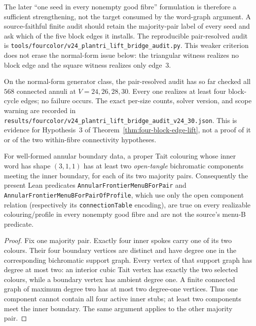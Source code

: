 The later ``one seed in every nonempty good fibre'' formulation is therefore
a sufficient strengthening, not the target consumed by the word-graph
argument.  A source-faithful finite audit should retain the majority-pair
label of every seed and ask which of the five block edges it installs.  The
reproducible pair-resolved audit is
\texttt{tools/fourcolor/v24\_plantri\_lift\_bridge\_audit.py}.  This weaker
criterion does not erase the normal-form issue below: the triangular witness
realizes no block edge and the square witness realizes only edge~$3$.

On the normal-form generator class, the pair-resolved audit has so far checked
all $568$ connected annuli at $V=24,26,28,30$.  Every one realizes at
least four block-cycle edges; no failure occurs.  The exact per-size counts,
solver version, and scope warning are recorded in
\texttt{results/fourcolor/v24\_plantri\_lift\_bridge\_audit\_v24\_30.json}.
This is evidence for Hypothesis~3 of
Theorem~\ref{thm:four-block-edge-lift}, not a proof of it or of the two
within-fibre connectivity hypotheses.

\begin{proposition}
\label{prop:open-menu-predicate-vacuous}
\Sprose
For well-formed annular boundary data, a proper Tait colouring whose inner
word has shape $(3,1,1)$ has at least two \emph{open-tangle} bichromatic
components meeting the inner boundary, for each of its two majority pairs.
Consequently the present Lean predicates
\texttt{AnnularFrontierMenuBForPair} and
\texttt{AnnularFrontierMenuBForPairOfProfile}, which use only the open
component relation (respectively its \texttt{connectionTable} encoding), are
true on every realizable colouring/profile in every nonempty good fibre and
are not the source's menu-B predicate.
\end{proposition}

\begin{proof}
Fix one majority pair.  Exactly four inner spokes carry one of its two
colours.  Their four boundary vertices are distinct and have degree one in
the corresponding bichromatic support graph.  Every vertex of that support
graph has degree at most two: an interior cubic Tait vertex has exactly the
two selected colours, while a boundary vertex has ambient degree one.
A finite connected graph of maximum degree two has at most two degree-one
vertices.  Thus one component cannot contain all four active inner stubs;
at least two components meet the inner boundary.  The same argument applies
to the other majority pair.
\end{proof}

